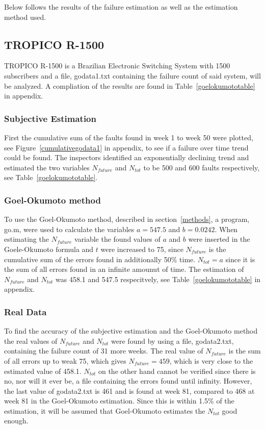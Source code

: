 Below follows the results of the failure estimation as well as the estimation method used.

\subsection{TROPICO R-1500}
TROPICO R-1500 is a Brazilian Electronic Switching System with 1500 subscribers and a file, godata1.txt containing the failure count of said system, will be analyzed. A compliation of the results are found in Table~\ref{goelokumototable} in appendix.
\subsubsection*{Subjective Estimation} 
First the cumulative sum of the faults found in week 1 to week 50 were plotted, see Figure~\ref{cumulativegodata1} in appendix, to see if a failure over time trend could be found.
The inspectors identified an exponentially declining trend and estimated the two variables $N_{future}$ and $N_{tot}$ to be 500 and 600 faults respectively, see Table~\ref{goelokumototable}. 
\subsubsection*{Goel-Okumoto method}
To use the Goel-Okumoto method, described in section~\ref{methods}, a program, go.m, were used to calculate the variables $a=547.5$ and $b=0.0242$.
When estimating the $N_{future}$ variable the found values of $a$ and $b$ were inserted in the Goele-Okumoto formula and $t$ were increased to 75, since $N_{future}$ is the cumulative sum of the errors found in additionally 50\% time. 
$N_{tot} = a$ since it is the sum of all errors found in an infinite amounut of time.
The estimation of $N_{future}$ and $N_{tot}$ was 458.1 and 547.5 respecitvely, see Table~\ref{goelokumototable} in appendix.
\subsubsection*{Real Data}
To find the accuracy of the subjective estimation and the Goel-Okumoto method the real values of $N_{future}$ and $N_{tot}$ were found by using a file, godata2.txt, containing the failure count of 31 more weeks. 
The real value of $N_{future}$ is the sum of all errors up to weak 75, which gives $N_{future}=459$, which is very close to the estimated value of 458.1. $N_{tot}$ on the other hand cannot be verified since there is no, nor will it ever be, a file containing the errors found until infinity. However, the last value of godata2.txt is 461 and is found at week 81, compared to 468 at week 81 in the Goel-Okumoto estimation. Since this is within 1.5\% of the estimation, it will be assumed that Goel-Okumoto estimates the $N_{tot}$ good enough.



